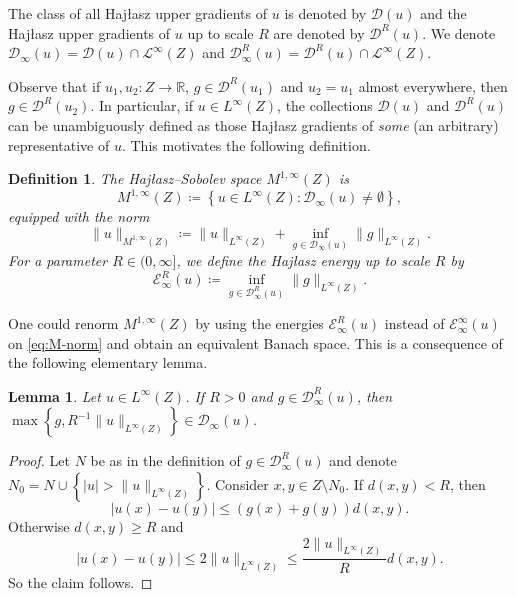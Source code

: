 \documentclass[reqno]{amsart}
\numberwithin{equation}{section}
\newtheorem{lemma}[theorem]{Lemma}
\newtheorem{definition}[theorem]{Definition}
\theoremstyle{remark}
\def\r{\right}
\def\lf{\left}
\begin{document}
The class of all Haj\l{}asz upper gradients of $u$ is denoted by $\mathcal{D}(u)$ and the Haj\l{}asz upper gradients of $u$ up to scale $R$ are denoted by $\mathcal{D}^{R}(u)$. We denote $\mathcal{D}_{\infty}(u) = \mathcal{D}(u) \cap \mathcal{L}^{\infty}(Z)$ and $\mathcal{D}_{\infty}^{R}(u) = \mathcal{D}^{R}(u) \cap \mathcal L^{\infty}(Z)$.  

Observe that if $u_1, u_{2}\colon Z\to\mathbb R$, $g \in \mathcal{D}^{R}( u_1 )$ and $u_2 = u_1$ almost everywhere, then $g \in \mathcal{D}^{R}( u_2 )$. In particular, if $u \in L^{\infty}( Z )$, the collections $\mathcal{D}( u )$ and $\mathcal{D}^R( u )$  can be unambiguously defined as those Haj\l{}asz gradients of \emph{some} (an arbitrary) representative of $u$. This motivates the following definition.
\begin{definition}\label{de:Mspace}
The Haj\l{}asz--Sobolev space $M^{1,\infty}(Z)$ is 
    \[  M^{1, \infty}(Z)\coloneqq\lf\{u\in L^{\infty}(Z) \colon \mathcal D_\infty(u)\neq\emptyset\r\},  \]
equipped with the norm 
\begin{equation}\label{eq:M-norm}
     \|u\|_{M^{1, \infty}(Z)}\coloneqq\|u\|_{L^\infty(Z)}+\inf_{g\in\mathcal D_\infty(u)}\|g\|_{L^\infty(Z)}. 
\end{equation}
For a parameter $R \in (0,\infty]$, we define the \emph{Haj\l{}asz energy up to scale $R$} by
\[\mathcal{E}_{\infty}^{R}( u ) \coloneqq \inf_{g\in\mathcal D_\infty^{R}(u)}\|g\|_{L^\infty(Z)}.\]
\end{definition}
One could renorm $M^{1,\infty}(Z)$ by using the energies $\mathcal{E}_{\infty}^{R}( u )$ instead of  $\mathcal{E}_{\infty}^{\infty}( u )$ on \eqref{eq:M-norm} and obtain an equivalent Banach space. This is a consequence of the following elementary lemma.
\begin{lemma}\label{lemm:local:to:global}
Let $u \in L^{\infty}(Z)$. If $R > 0$ and $g \in \mathcal{D}_{\infty}^{R}( u )$, then $\max\left\{ g, R^{-1} \|u\|_{ L^{\infty}(Z) } \right\} \in \mathcal{D}_{\infty}(u)$.
\end{lemma}
\begin{proof}
Let $N$ be as in the definition of $g \in \mathcal{D}_{\infty}^{R}(u)$ and denote $N_0 = N \cup \left\{ |u| > \|u\|_{ L^{\infty}(Z) } \right\}$. Consider $x, y \in Z \setminus N_0$. If $d( x, y ) < R$, then
\begin{equation*}
    | u(x)-u(y) | \leq (g(x)+g(y)) d(x,y).
\end{equation*}
Otherwise $d(x,y) \geq R$ and
\begin{equation*}
    | u(x) - u(y) | \leq 2\|u\|_{ L^{\infty}(Z) } \leq \frac{ 2 \|u\|_{ L^{\infty}(Z) } }{ R } d(x,y).
\end{equation*}
So the claim follows.
\end{proof}
\end{document}
